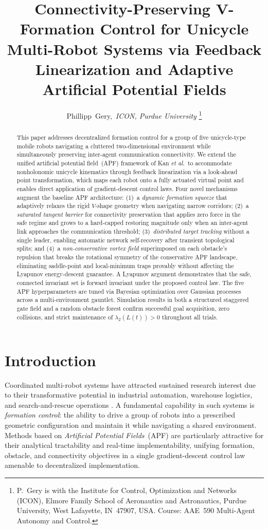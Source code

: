 \documentclass[letterpaper, 10 pt, journal, twoside]{IEEEtran}
\title{Connectivity-Preserving V-Formation Control for Unicycle
       Multi-Robot Systems via Feedback Linearization and
       Adaptive Artificial Potential Fields}
\author{Phillipp~Gery,~\textit{ICON, Purdue University}%
\thanks{P.~Gery is with the Institute for Control, Optimization and Networks
        (ICON), Elmore Family School of Aeronautics and Astronautics,
        Purdue University, West Lafayette, IN~47907, USA.
        Course: AAE~590 Multi-Agent Autonomy and Control.}}
\begin{document}
\maketitle


\begin{abstract}
This paper addresses decentralized formation control for a group of five
unicycle-type mobile robots navigating a cluttered two-dimensional environment
while simultaneously preserving inter-agent communication connectivity.
We extend the unified artificial potential field~(APF) framework of Kan
\emph{et al.}\ to accommodate nonholonomic unicycle kinematics through
feedback linearization via a look-ahead point transformation, which maps
each robot onto a fully actuated virtual point and enables direct application
of gradient-descent control laws.  Four novel mechanisms augment the
baseline APF architecture: (1)~a \emph{dynamic formation squeeze} that
adaptively relaxes the rigid $V$-shape geometry when navigating narrow
corridors; (2)~a \emph{saturated tangent barrier} for connectivity
preservation that applies zero force in the safe regime and grows to a
hard-capped restoring magnitude only when an inter-agent link approaches the
communication threshold; (3)~\emph{distributed target tracking} without
a single leader, enabling automatic network self-recovery after transient
topological splits; and (4)~a \emph{non-conservative vortex field}
superimposed on each obstacle's repulsion that breaks the rotational
symmetry of the conservative APF landscape, eliminating saddle-point and
local-minimum traps provably without affecting the Lyapunov energy-descent
guarantee.  A Lyapunov argument demonstrates that the safe,
connected invariant set is forward invariant under the proposed control law.
The five APF hyperparameters are tuned via Bayesian optimization over
Gaussian processes \cite{shahriari2016JMLR} across a multi-environment
gauntlet.  Simulation results in both a structured staggered gate field and
a random obstacle forest confirm successful goal acquisition, zero collisions,
and strict maintenance of $\lambda_{2}(L(t))>0$ throughout all trials.
\end{abstract}


\section{Introduction}

Coordinated multi-robot systems have attracted sustained research interest
due to their transformative potential in industrial automation, warehouse
logistics, and search-and-rescue operations \cite{wang2025RaAS}.
A fundamental capability in such systems is \emph{formation control}: the
ability to drive a group of robots into a prescribed geometric configuration
and maintain it while navigating a shared environment.
Methods based on \emph{Artificial Potential Fields}~(APF)
\cite{khatib1986IJRR,leonard2001P4ICDCCN,olfatisaber2006TAC} are
particularly attractive for their analytical tractability and real-time
implementability, unifying formation, obstacle, and connectivity objectives
in a single gradient-descent control law amenable to decentralized
implementation.
\end{document}
